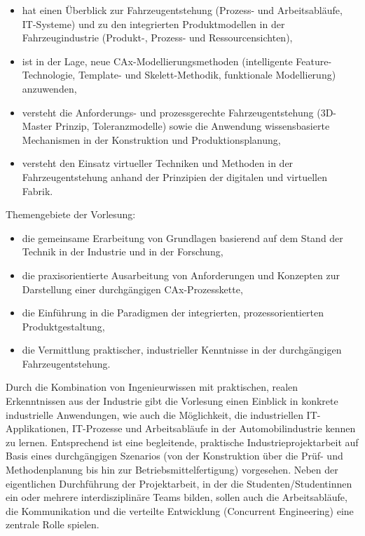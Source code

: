 \begin{module}
\begin{learningoutcomes}
 \begin{itemize}\item hat einen Überblick zur Fahrzeugentstehung (Prozess- und Arbeitsabläufe, IT-Systeme) und zu den integrierten Produktmodellen in der Fahrzeugindustrie (Produkt-, Prozess- und Ressourcensichten),   \item ist in der Lage, neue CAx-Modellierungsmethoden (intelligente Feature-Technologie, Template- und Skelett-Methodik, funktionale Modellierung) anzuwenden,   \item versteht die Anforderungs- und prozessgerechte Fahrzeugentstehung (3D-Master Prinzip, Toleranzmodelle) sowie die Anwendung wissensbasierte Mechanismen in der Konstruktion und Produktionsplanung,  \item versteht den Einsatz virtueller Techniken und Methoden in der Fahrzeugentstehung anhand der Prinzipien der digitalen und virtuellen Fabrik.  \end{itemize}
\end{learningoutcomes}

\begin{content}
Themengebiete der Vorlesung:

 \begin{itemize}\item die gemeinsame Erarbeitung von Grundlagen basierend auf dem Stand der Technik in der Industrie und in der Forschung,   \item die praxisorientierte Ausarbeitung von Anforderungen und Konzepten zur Darstellung einer durchgängigen CAx-Prozesskette,   \item die Einführung in die Paradigmen der integrierten, prozessorientierten Produktgestaltung,   \item die Vermittlung praktischer, industrieller Kenntnisse in der durchgängigen Fahrzeugentstehung.   \end{itemize}

Durch die Kombination von Ingenieurwissen mit praktischen, realen Erkenntnissen aus der Industrie gibt die Vorlesung einen Einblick in konkrete industrielle Anwendungen, wie auch die Möglichkeit, die industriellen IT-Applikationen, IT-Prozesse und Arbeitsabläufe in der Automobilindustrie kennen zu lernen. Entsprechend ist eine begleitende, praktische Industrieprojektarbeit auf Basis eines durchgängigen Szenarios (von der Konstruktion über die Prüf- und Methodenplanung bis hin zur Betriebsmittelfertigung) vorgesehen. \newline
\newline
 Neben der eigentlichen Durchführung der Projektarbeit, in der die Studenten/Studentinnen ein oder mehrere interdisziplinäre Teams bilden, sollen auch die Arbeitsabläufe, die Kommunikation und die verteilte Entwicklung (Concurrent Engineering) eine zentrale Rolle spielen.


\end{content}



\end{module}


